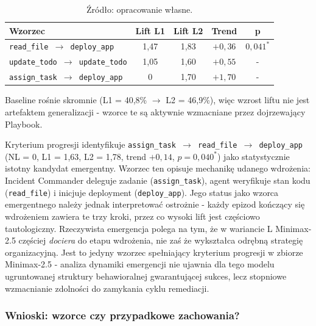 \begin{table}[H]
    \centering
    \caption{Wzorce narzędziowe z rosnącym trendem L1$\to$L2 dla modelu Minimax-2.5 (epizody 1--49 vs.\ 50--98 w wariancie L). Myślnik (-) oznacza brak istotności statystycznej.}
    \label{tab:l1l2-minimax}
    \footnotesize
    \begin{tabular}{p{}cccc}
        \hline
        \textbf{Wzorzec} & \textbf{Lift L1} & \textbf{Lift L2} & \textbf{Trend} & \textbf{p} \\
        \hline
        \texttt{read\_file $\to$ deploy\_app}      & 1,47 & 1,83 & $+0{,}36$ & $0{,}041^{*}$ \\
        \texttt{update\_todo $\to$ update\_todo}   & 1,05 & 1,60 & $+0{,}55$ & -             \\
        \texttt{assign\_task $\to$ deploy\_app}    & 0     & 1,70 & $+1{,}70$ & -             \\
        \hline
   \end{tabular}
    \caption*{\footnotesize Źródło: opracowanie własne.}
\end{table}

Baseline rośnie skromnie (L1 = 40,8\% $\to$ L2 = 46,9\%), więc wzrost liftu nie jest artefaktem generalizacji - wzorce te są aktywnie wzmacniane przez dojrzewający Playbook.

Kryterium progresji identyfikuje \texttt{assign\_task $\to$ read\_file $\to$ deploy\_app} (NL = 0, L1 = 1,63, L2 = 1,78, trend $+0{,}14$, $p=0{,}040^{*}$) jako statystycznie istotny kandydat emergentny. Wzorzec ten opisuje mechanikę udanego wdrożenia: Incident Commander deleguje zadanie (\texttt{assign\_task}), agent weryfikuje stan kodu (\texttt{read\_file}) i inicjuje deployment (\texttt{deploy\_app}). Jego status jako wzorca emergentnego należy jednak interpretować ostrożnie - każdy epizod kończący się wdrożeniem zawiera te trzy kroki, przez co wysoki lift jest częściowo tautologiczny. Rzeczywista emergencja polega na tym, że w wariancie L Minimax-2.5 częściej \emph{dociera} do etapu wdrożenia, nie zaś że wykształca odrębną strategię organizacyjną. Jest to jedyny wzorzec spełniający kryterium progresji w zbiorze Minimax-2.5 - analiza dynamiki emergencji nie ujawnia dla tego modelu ugruntowanej struktury behawioralnej gwarantującej sukces, lecz stopniowe wzmacnianie zdolności do zamykania cyklu remediacji.

\subsubsection{Wnioski: wzorce czy przypadkowe zachowania?}

